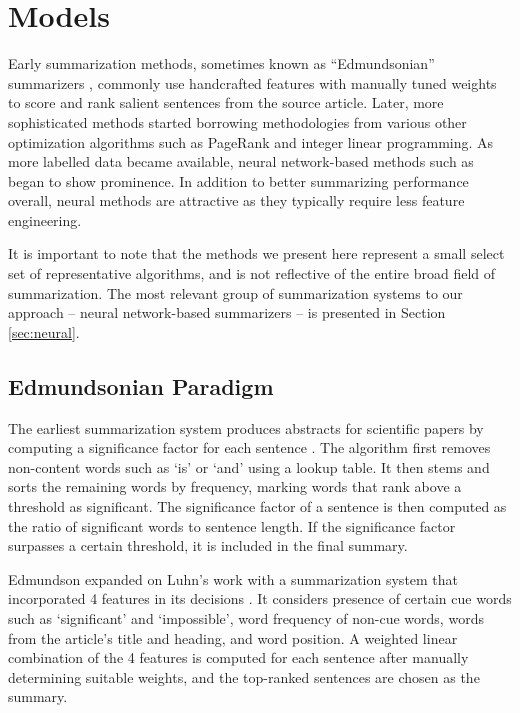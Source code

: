 \section{Models}
Early summarization methods, sometimes known as ``Edmundsonian'' summarizers \parencite{afantenos2005}, commonly use handcrafted features with manually tuned weights to score and rank salient sentences from the source article. Later, more sophisticated methods started borrowing methodologies from various other optimization algorithms such as PageRank and integer linear programming. As more labelled data became available, neural network-based methods such as \cite{cheng-lapata-2016-neural} began to show prominence. In addition to better summarizing performance overall, neural methods are attractive as they typically require less feature engineering.

It is important to note that the methods we present here represent a small select set of representative algorithms, and is not reflective of the entire broad field of summarization. The most relevant group of summarization systems to our approach -- neural network-based summarizers -- is presented in Section \ref{sec:neural}.

\subsection{Edmundsonian Paradigm}
The earliest summarization system produces abstracts for scientific papers by computing a significance factor for each sentence \parencite{luhn}. The algorithm first removes non-content words such as `is' or `and' using a lookup table. It then stems and sorts the remaining words by frequency, marking words that rank above a threshold as significant. The significance factor of a sentence is then computed as the ratio of significant words to sentence length. If the significance factor surpasses a certain threshold, it is included in the final summary.

Edmundson expanded on Luhn's work with a summarization system that incorporated 4 features in its decisions \parencite{edmundson}. It considers presence of certain cue words such as `significant' and `impossible', word frequency of non-cue words, words from the article's title and heading, and word position. A weighted linear combination of the 4 features is computed for each sentence after manually determining suitable weights, and the top-ranked sentences are chosen as the summary.

